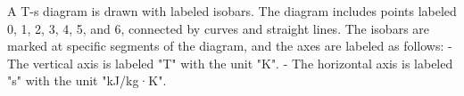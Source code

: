 A T-s diagram is drawn with labeled isobars. The diagram includes points labeled 0, 1, 2, 3, 4, 5, and 6, connected by curves and straight lines. The isobars are marked at specific segments of the diagram, and the axes are labeled as follows:  
- The vertical axis is labeled "T" with the unit "K".  
- The horizontal axis is labeled "s" with the unit "kJ/kg·K".